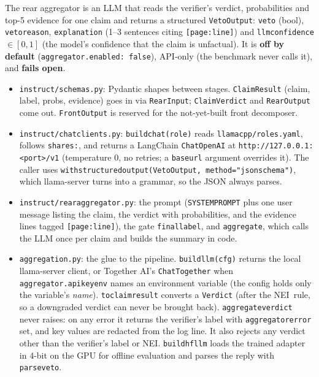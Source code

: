 \documentclass[11pt,a4paper]{article}
\makeatletter
\DeclareRobustCommand{\_}{\ifmmode\nfss@text{\textunderscore}\else\textunderscore\allowbreak\fi}
\newcommand{\file}[1]{\texttt{#1}}
\newcommand{\NEI}{\textup{NEI}}
\makeatother
\begin{document}
The rear aggregator is an LLM that reads the verifier's verdict, probabilities and top-5 evidence for one claim and
returns a structured \texttt{VetoOutput}:
\texttt{veto} (bool), \texttt{veto\_reason}, \texttt{explanation} (1--3 sentences citing \texttt{[page:line]}) and
\texttt{llm\_confidence}$\in[0,1]$ (the model's confidence that the claim is unfactual). It is \textbf{off by default}
(\texttt{aggregator.enabled: false}), API-only (the benchmark never calls it), and \textbf{fails open}.

\begin{itemize}
  \item \file{instruct/schemas.py}: Pydantic shapes between stages. \texttt{ClaimResult} (claim, label, probs,
        evidence) goes in via \texttt{RearInput}; \texttt{ClaimVerdict} and \texttt{RearOutput} come out.
        \texttt{FrontOutput} is reserved for the not-yet-built front decomposer.
  \item \file{instruct/chat\_clients.py}: \texttt{build\_chat(role)} reads \file{llamacpp/roles.yaml}, follows
        \texttt{shares:}, and returns a LangChain \texttt{ChatOpenAI} at \texttt{http://127.0.0.1:<port>/v1}
        (temperature 0, no retries; a \texttt{base\_url} argument overrides it). The caller uses
        \texttt{with\_structured\_output(VetoOutput, method="json\_schema")}, which llama-server turns into a grammar,
        so the JSON always parses.
  \item \file{instruct/rear\_aggregator.py}: the prompt (\texttt{SYSTEM\_PROMPT} plus one user message listing the claim,
        the verdict with probabilities, and the evidence lines tagged \texttt{[page:line]}), the gate
        \texttt{final\_label}, and \texttt{aggregate}, which calls the LLM once per claim and builds the summary in
        code.
  \item \file{aggregation.py}: the glue to the pipeline. \texttt{build\_llm(cfg)} returns the local llama-server client,
        or Together AI's \texttt{ChatTogether} when \texttt{aggregator.api\_key\_env} names an environment variable (the
        config holds only the variable's \emph{name}). \texttt{to\_claim\_result} converts a \texttt{Verdict}
        (after the \NEI\ rule, so a downgraded verdict can never be brought back). \texttt{aggregate\_verdict} never
        raises: on any error it returns the verifier's label with \texttt{aggregator\_error} set, and key values
        are redacted from the log line. It also rejects any verdict other than the verifier's label or \NEI.
        \texttt{build\_hf\_llm} loads the trained adapter in 4-bit on the GPU for offline evaluation and parses the
        reply with \texttt{parse\_veto}.
\end{itemize}
\end{document}
